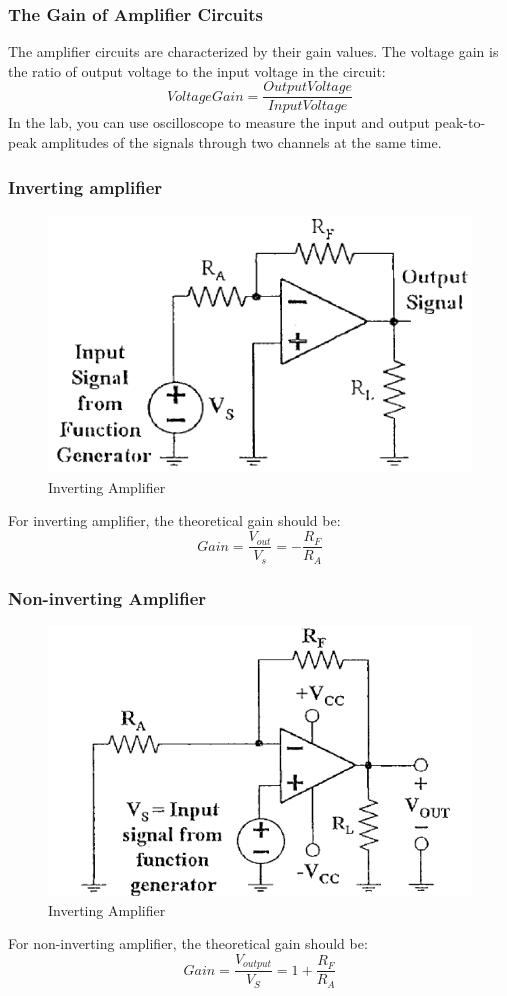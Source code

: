 \documentclass[12pt]{article}
\begin{document}
\subsubsection{The Gain of Amplifier Circuits}
The amplifier circuits are characterized by their gain values. The voltage gain
is the ratio of output voltage to the input voltage in the circuit:
$$Voltage Gain=\frac{OutputVoltage}{InputVoltage}$$
In the lab, you can use oscilloscope to measure the input and output
peak-to-peak amplitudes of the signals through two channels at the same
time.
\subsubsection{Inverting amplifier}
\begin{figure}[H]
\centering
\includegraphics[scale=0.3]{P3.jpg}
\caption{Inverting Amplifier}
\end{figure}
For inverting amplifier, the theoretical gain should be:
$$Gain=\frac{V_{out}}{V_s}=-\frac{R_F}{R_A}$$
\subsubsection{Non-inverting Amplifier}
\begin{figure}[H]
\centering
\includegraphics[scale=0.3]{P4.jpg}
\caption{Inverting Amplifier}
\end{figure}
For non-inverting amplifier, the theoretical gain should be:
$$Gain=\frac{V_{output}}{V_S}=1+\frac{R_F}{R_A}$$
\end{document}
